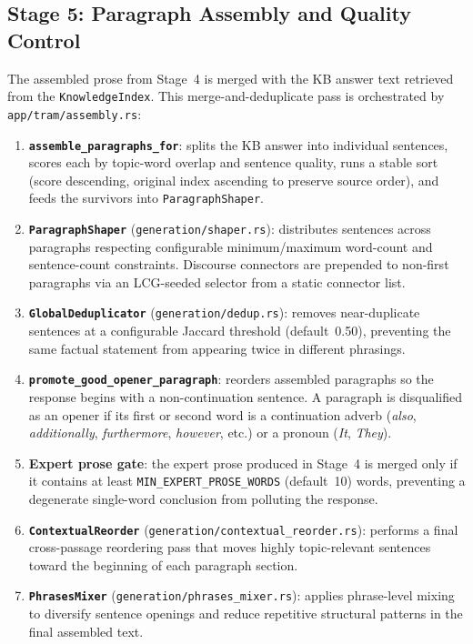 \documentclass[11pt,a4paper]{article}
\begin{document}
\subsection{Stage 5: Paragraph Assembly and Quality Control}
\label{sec:assembly}

The assembled prose from Stage~4 is merged with the KB answer text retrieved from the
\texttt{KnowledgeIndex}. This merge-and-deduplicate pass is orchestrated by
\texttt{app/tram/assembly.rs}:

\begin{enumerate}[noitemsep,topsep=4pt]
  \item \textbf{\texttt{assemble\_paragraphs\_for}}: splits the KB answer into individual
        sentences, scores each by topic-word overlap and sentence quality, runs a stable
        sort (score descending, original index ascending to preserve source order), and
        feeds the survivors into \texttt{ParagraphShaper}.
  \item \textbf{\texttt{ParagraphShaper}} (\texttt{generation/shaper.rs}): distributes
        sentences across paragraphs respecting configurable minimum/maximum word-count and
        sentence-count constraints. Discourse connectors are prepended to non-first
        paragraphs via an LCG-seeded selector from a static connector list.
  \item \textbf{\texttt{GlobalDeduplicator}} (\texttt{generation/dedup.rs}): removes
        near-duplicate sentences at a configurable Jaccard threshold (default~0.50),
        preventing the same factual statement from appearing twice in different phrasings.
  \item \textbf{\texttt{promote\_good\_opener\_paragraph}}: reorders assembled paragraphs so
        the response begins with a non-continuation sentence. A paragraph is disqualified as
        an opener if its first or second word is a continuation adverb (\textit{also},
        \textit{additionally}, \textit{furthermore}, \textit{however}, etc.) or a pronoun
        (\textit{It}, \textit{They}).
  \item \textbf{Expert prose gate}: the expert prose produced in Stage~4 is merged only if
        it contains at least \texttt{MIN\_EXPERT\_PROSE\_WORDS} (default~10) words, preventing
        a degenerate single-word conclusion from polluting the response.
  \item \textbf{\texttt{ContextualReorder}} (\texttt{generation/contextual\_reorder.rs}):
        performs a final cross-passage reordering pass that moves highly topic-relevant
        sentences toward the beginning of each paragraph section.
  \item \textbf{\texttt{PhrasesMixer}} (\texttt{generation/phrases\_mixer.rs}): applies
        phrase-level mixing to diversify sentence openings and reduce repetitive structural
        patterns in the final assembled text.
\end{enumerate}
\end{document}
